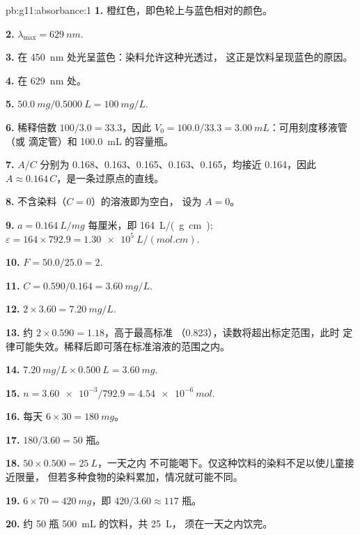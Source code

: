 \begin{solution}{pb:g11:absorbance:1}
\textbf{1.} 橙红色，即色轮上与蓝色相对的颜色。

\textbf{2.} $\lambda_{\max} = \qty{629}{nm}$.

\textbf{3.} 在 \qty{450}{nm} 处光呈蓝色：染料允许这种光透过，
这正是饮料呈现蓝色的原因。

\textbf{4.} 在 \qty{629}{nm} 处。

\textbf{5.} $\qty{50.0}{mg} / \qty{0.5000}{L} = \qty{100}{mg/L}$.

\textbf{6.} 稀释倍数 $100 / 3.0 = 33.3$，因此
$V_0 = 100.0 / 33.3 = \qty{3.00}{mL}$：可用刻度移液管（或
滴定管）和 \qty{100.0}{mL} 的容量瓶。

\textbf{7.} $A/C$ 分别为 0.168、0.163、0.165、0.163、0.165，均接近
0.164，因此 $A \approx 0.164\, C$，是一条过原点的直线。

\textbf{8.} 不含染料（$C = 0$）的溶液即为空白，
设为 $A = 0$。

\textbf{9.} $a = \qty{0.164}{L/mg}$ 每厘米，即
\qty{164}{L/(g.cm)}; $\varepsilon = 164 \times 792.9 =
\qty{1.30e5}{L/(mol.cm)}$.

\textbf{10.} $F = 50.0 / 25.0 = 2$.

\textbf{11.} $C = 0.590 / 0.164 = \qty{3.60}{mg/L}$.

\textbf{12.} $2 \times 3.60 = \qty{7.20}{mg/L}$.

\textbf{13.} 约 $2 \times 0.590 = 1.18$，高于最高标准
（0.823），读数将超出标定范围，此时
定律可能失效。稀释后即可落在标准溶液的范围之内。

\textbf{14.} $\qty{7.20}{mg/L} \times \qty{0.500}{L} = \qty{3.60}{mg}$.

\textbf{15.} $n = \num{3.60e-3} / 792.9 = \qty{4.54e-6}{mol}$.

\textbf{16.} 每天 $6 \times 30 = \qty{180}{mg}$。

\textbf{17.} $180 / 3.60 = 50$ 瓶。

\textbf{18.} $50 \times 0.500 = \qty{25}{L}$，一天之内
不可能喝下。仅这种饮料的染料不足以使儿童接近限量，
但若多种食物的染料累加，情况就可能不同。

\textbf{19.} $6 \times 70 = \qty{420}{mg}$，即 $420 / 3.60 \approx
117$ 瓶。

\textbf{20.} 约 50 瓶 \qty{500}{mL} 的饮料，共 \qty{25}{L}，
须在一天之内饮完。
\end{solution}
